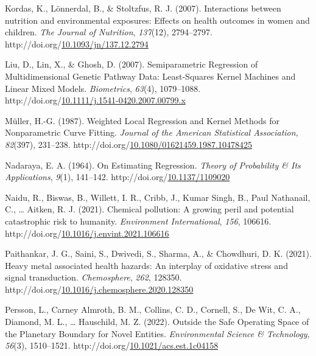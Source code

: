 \documentclass[12pt, twoside]{amherstthesis}
\newenvironment{CSLReferences}[2]%
  {}%
  {\par}
\begin{document}
\begin{CSLReferences}{1}{0}
\leavevmode{}%
Kordas, K., Lönnerdal, B., \& Stoltzfus, R. J. (2007). Interactions between nutrition and environmental exposures: Effects on health outcomes in women and children. \emph{The Journal of Nutrition}, \emph{137}(12), 2794--2797. http://doi.org/\href{https://doi.org/10.1093/jn/137.12.2794}{10.1093/jn/137.12.2794}

\leavevmode{}%
Liu, D., Lin, X., \& Ghosh, D. (2007). Semiparametric {Regression} of {Multidimensional} {Genetic} {Pathway} {Data}: {Least}-{Squares} {Kernel} {Machines} and {Linear} {Mixed} {Models}. \emph{Biometrics}, \emph{63}(4), 1079--1088. http://doi.org/\href{https://doi.org/10.1111/j.1541-0420.2007.00799.x}{10.1111/j.1541-0420.2007.00799.x}

\leavevmode{}%
Müller, H.-G. (1987). Weighted {Local} {Regression} and {Kernel} {Methods} for {Nonparametric} {Curve} {Fitting}. \emph{Journal of the American Statistical Association}, \emph{82}(397), 231--238. http://doi.org/\href{https://doi.org/10.1080/01621459.1987.10478425}{10.1080/01621459.1987.10478425}

\leavevmode{}%
Nadaraya, E. A. (1964). On {Estimating} {Regression}. \emph{Theory of Probability \& Its Applications}, \emph{9}(1), 141--142. http://doi.org/\href{https://doi.org/10.1137/1109020}{10.1137/1109020}

\leavevmode{}%
Naidu, R., Biswas, B., Willett, I. R., Cribb, J., Kumar Singh, B., Paul Nathanail, C., \ldots{} Aitken, R. J. (2021). Chemical pollution: {A} growing peril and potential catastrophic risk to humanity. \emph{Environment International}, \emph{156}, 106616. http://doi.org/\href{https://doi.org/10.1016/j.envint.2021.106616}{10.1016/j.envint.2021.106616}

\leavevmode{}%
Paithankar, J. G., Saini, S., Dwivedi, S., Sharma, A., \& Chowdhuri, D. K. (2021). Heavy metal associated health hazards: {An} interplay of oxidative stress and signal transduction. \emph{Chemosphere}, \emph{262}, 128350. http://doi.org/\href{https://doi.org/10.1016/j.chemosphere.2020.128350}{10.1016/j.chemosphere.2020.128350}

\leavevmode{}%
Persson, L., Carney Almroth, B. M., Collins, C. D., Cornell, S., De Wit, C. A., Diamond, M. L., \ldots{} Hauschild, M. Z. (2022). Outside the {Safe} {Operating} {Space} of the {Planetary} {Boundary} for {Novel} {Entities}. \emph{Environmental Science \& Technology}, \emph{56}(3), 1510--1521. http://doi.org/\href{https://doi.org/10.1021/acs.est.1c04158}{10.1021/acs.est.1c04158}


\end{CSLReferences}
\end{document}
